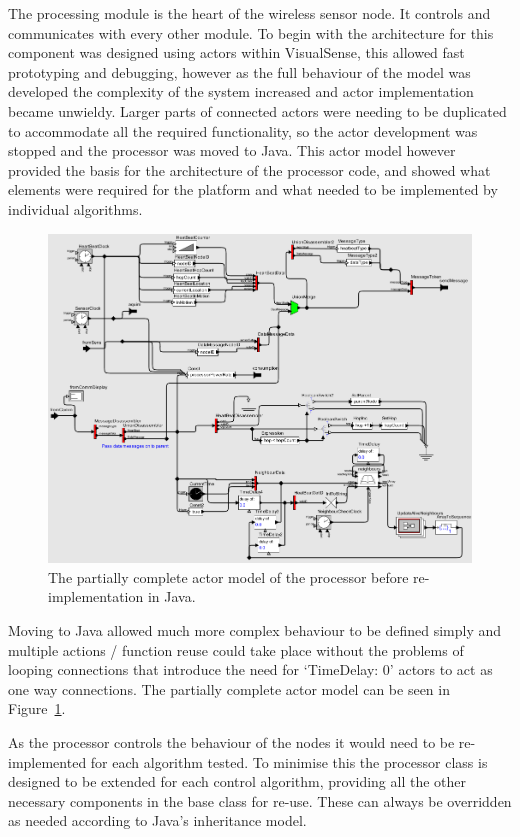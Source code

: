 \documentclass[authoryearcitations]{UoYCSproject}
\begin{document}
The processing module is the heart of the wireless sensor node. It controls and communicates with every other module. To begin with the architecture for this component was designed using actors within VisualSense, this allowed fast prototyping and debugging, however as the full behaviour of the model was developed the complexity of the system increased and actor implementation became unwieldy. Larger parts of connected actors were needing to be duplicated to accommodate all the required functionality, so the actor development was stopped and the processor was moved to Java. This actor model however provided the basis for the architecture of the processor code, and showed what elements were required for the platform and what needed to be implemented by individual algorithms.

\begin{figure}
 \centering
    \includegraphics[width=\textwidth]{figures/processorInternals.png}
    \caption{The partially complete actor model of the processor before re-implementation in Java.}
    \label{fig:processorInternals}
\end{figure}

Moving to Java allowed much more complex behaviour to be defined simply and multiple actions / function reuse could take place without the problems of looping connections that introduce the need for `TimeDelay: 0' actors to act as one way connections. The partially complete actor model can be seen in Figure~\ref{fig:processorInternals}.

As the processor controls the behaviour of the nodes it would need to be re-implemented for each algorithm tested. To minimise this the processor class is designed to be extended for each control algorithm, providing all the other necessary components in the base class for re-use. These can always be overridden as needed according to Java's inheritance model.
\end{document}
